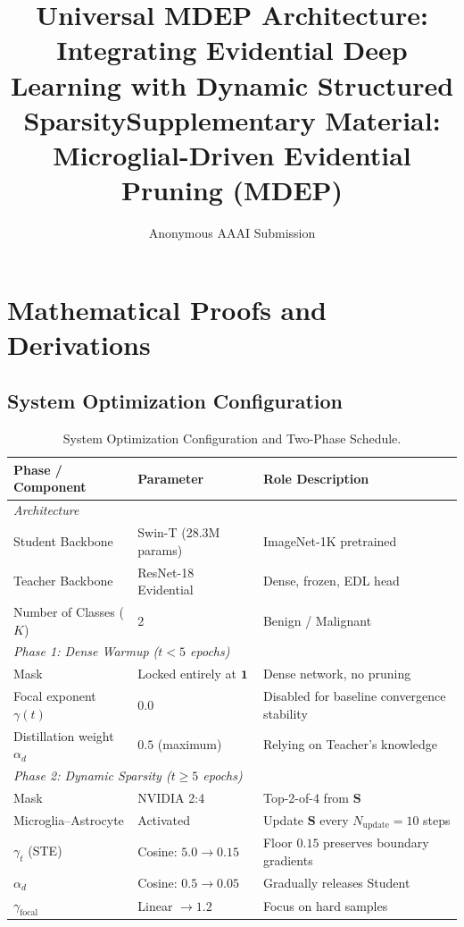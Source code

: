 \documentclass[letterpaper]{article} %
\title{Universal MDEP Architecture: Integrating Evidential Deep Learning with Dynamic Structured Sparsity}
\author{Anonymous AAAI Submission}
\begin{document}
\title{Supplementary Material: Microglial-Driven Evidential Pruning (MDEP)}
\maketitle
\appendix
\section{Mathematical Proofs and Derivations}

\subsection{System Optimization Configuration}
\begin{table}[H]
\centering
\caption{System Optimization Configuration and Two-Phase Schedule.}
\label{tab:config}
\begin{tabular}{@{}lll@{}}
\toprule
\textbf{Phase / Component} & \textbf{Parameter} & \textbf{Role Description} \\
\midrule
\multicolumn{3}{l}{\emph{Architecture}} \\
Student Backbone & Swin-T (28.3M params) & ImageNet-1K pretrained \\
Teacher Backbone & ResNet-18 Evidential & Dense, frozen, EDL head \\
Number of Classes ($K$) & 2 & Benign / Malignant \\
\midrule
\multicolumn{3}{l}{\emph{Phase 1: Dense Warmup ($t < 5$ epochs)}} \\
Mask & Locked entirely at $\bm{1}$ & Dense network, no pruning \\
Focal exponent $\gamma(t)$ & $0.0$ & Disabled for baseline convergence stability \\
Distillation weight $\alpha_d$ & $0.5$ (maximum) & Relying on Teacher's knowledge \\
\midrule
\multicolumn{3}{l}{\emph{Phase 2: Dynamic Sparsity ($t \ge 5$ epochs)}} \\
Mask & NVIDIA 2:4 & Top-2-of-4 from $\bm{S}$ \\
Microglia--Astrocyte & Activated & Update $\bm{S}$ every $N_{\text{update}} = 10$ steps \\
$\gamma_t$ (STE) & Cosine: $5.0 \to 0.15$ & Floor $0.15$ preserves boundary gradients \\
$\alpha_d$ & Cosine: $0.5 \to 0.05$ & Gradually releases Student \\
$\gamma_{\text{focal}}$ & Linear $\to 1.2$ & Focus on hard samples \\

\end{tabular}
\end{table}
\end{document}
